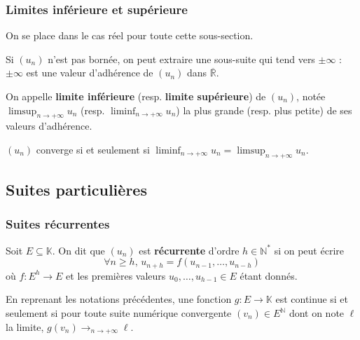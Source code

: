  \subsubsection{Limites inférieure et supérieure}


  On se place dans le cas réel pour toute cette sous-section.

  \begin{lemma}
    Si $(u_n)$ n'est pas bornée, on peut extraire une sous-suite qui tend vers $\pm \infty$ : $\pm \infty$ est une valeur d'adhérence de $(u_n)$ dans $\overline{\mathbb{R}}$.
  \end{lemma}

  \begin{definition}
    On appelle \textbf{limite inférieure} (resp. \textbf{limite supérieure}) de $(u_n)$, notée $\limsup_{n \rightarrow +\infty} u_n$ (resp. $\liminf_{n \rightarrow +\infty} u_n$) la plus grande (resp. plus petite) de ses valeurs d'adhérence.
  \end{definition}


  \begin{proposition}
    $(u_n)$ converge si et seulement si $\liminf_{n \rightarrow +\infty} u_n = \limsup_{n \rightarrow +\infty} u_n$.
  \end{proposition}

  \subsection{Suites particulières}

  \subsubsection{Suites récurrentes}


  \begin{definition}
    Soit $E \subseteq \mathbb{K}$. On dit que $(u_n)$ est \textbf{récurrente} d'ordre $h \in \mathbb{N}^*$ si on peut écrire
    \[ \forall n \geq h, \, u_{n+h} = f(u_{n-1}, \dots, u_{n-h}) \tag{$*$} \]
    où $f : E^h \rightarrow E$ et les premières valeurs $u_0, \dots, u_{h-1} \in E$ étant donnés.
  \end{definition}


  \begin{theorem}
    En reprenant les notations précédentes, une fonction $g : E \rightarrow \mathbb{K}$ est continue si et seulement si pour toute suite numérique convergente $(v_n) \in E^{\mathbb{N}}$ dont on note $\ell$ la limite, $g(v_n) \longrightarrow_{n \rightarrow +\infty} \ell$.
  \end{theorem}

